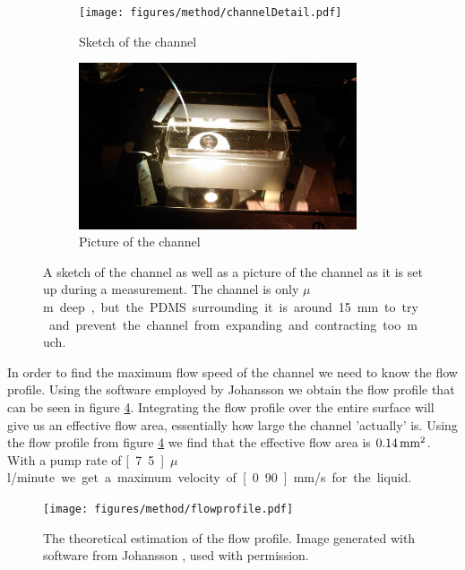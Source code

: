 \begin{figure}[H]
\centering
\begin{subfigure}[b]{0.45\textwidth}
\texttt{[image: figures/method/channelDetail.pdf]}
\caption{Sketch of the channel}\label{fig:channelsketch}
\end{subfigure}
\begin{subfigure}[b]{0.45\textwidth}
\includegraphics[width=0.9\textwidth]{figures/method/ChannelZoomed.jpg}
\caption{Picture of the channel}\label{fig:channelpicture}
\end{subfigure}
\caption{A sketch of the channel as well as a picture of the channel as it is set up during a measurement. The channel is only \unit[150]{$\mu$m} deep, but the PDMS surrounding it is around 15 mm to try and prevent the channel from expanding and contracting too much.}
\label{fig:channel}
\end{figure}

In order to find the maximum flow speed of the channel we need to know the flow profile. Using the software employed by Johansson \cite{AntonThesis} we obtain the flow profile that can be seen in figure \ref{fig:flowprofile}. Integrating 
the flow profile over the entire surface will give us an effective flow area, essentially how large the channel 'actually' is. 
Using the flow profile from figure \ref{fig:flowprofile} we find that the effective flow area is $\unit[0.14]{mm^2}$. With a pump rate of \unit[7.5]{$\mu$l/minute} we get a maximum velocity of \unit[0.90]{mm/s} for the liquid.



\begin{figure}[H]
\begin{center}
\texttt{[image: figures/method/flowprofile.pdf]}
\end{center}
\caption{The theoretical estimation of the flow profile. Image generated with software from Johansson \cite{AntonThesis}, used with permission.}
\label{fig:flowprofile}
\end{figure}

